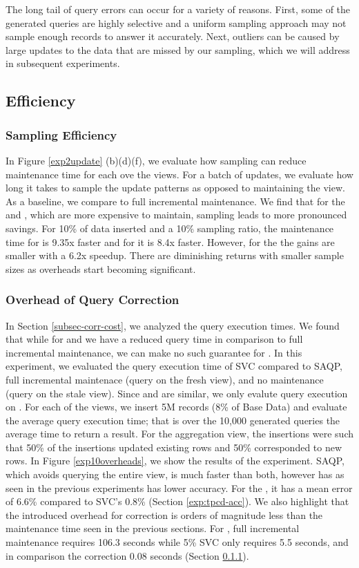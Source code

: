 The long tail of query errors can occur for a variety of reasons.
First, some of the generated queries are highly selective and a uniform sampling approach may not sample enough records to answer it accurately.
Next, outliers can be caused by large updates to the data that are missed by our sampling, which we will address in subsequent experiments.

\subsection{Efficiency}
\vspace{-.5em}
\subsubsection{Sampling Efficiency}\label{exp:tpcd-eff}
In Figure \ref{exp2update} (b)(d)(f), we evaluate how sampling can reduce maintenance time for each ove the views.
For a batch of updates, we evaluate how long it takes to sample the update patterns as opposed to maintaining the view.
As a baseline, we compare to full incremental maintenance.
We find that for the \aggview and \fjview, which are more expensive to maintain, sampling leads to more pronounced savings. 
For 10\% of data inserted and a 10\% sampling ratio, the maintenance time for \fjview  is 9.35x faster and for \aggview it is 8.4x faster.
However, for the \spview the gains are smaller with a 6.2x speedup.
There are diminishing returns with smaller sample sizes as overheads start becoming significant. 

\subsubsection{Overhead of Query Correction}
In Section \ref{subsec-corr-cost}, we analyzed the query execution times.
We found that while for \spview and \fjview we have a reduced query time in comparison to full incremental maintenance, we can make no such
guarantee for \aggview.
In this experiment, we evaluated the query execution time of SVC compared to SAQP, full incremental maintenace (query on the fresh view), and no maintenance (query on the stale view).
Since \spview and \fjview are similar, we only evalute query execution on \fjview.
For each of the views, we insert 5M records (8\% of Base Data) and evaluate the average query execution time; that is over the 10,000 generated queries the average time to return a result. 
For the aggregation view, the insertions were such that 50\% of the insertions updated existing rows and 50\% corresponded to new rows.
In Figure \ref{exp10overheads}, we show the results of the experiment.
SAQP, which avoids querying the entire view, is much faster than both, however has as seen in the previous experiments has lower accuracy. 
For the \aggview, it has a mean error of 6.6\% compared to SVC's 0.8\% (Section \ref{exp:tpcd-acc}).
We also highlight that the introduced overhead for correction is orders of magnitude less than the maintenance time seen in the previous sections.
For \aggview, full incremental maintenance requires 106.3 seconds while 5\% SVC only requires 5.5 seconds, and in comparison the correction 0.08 seconds (Section \ref{exp:tpcd-eff}).

